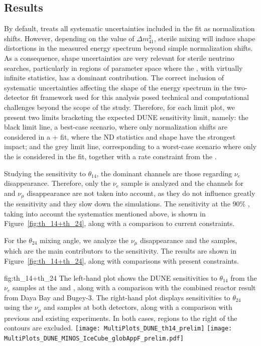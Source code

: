 \subsection{Results}
By default,  treats all systematic uncertainties included in the fit as normalization shifts. However, depending on the value of $\Delta m^2_{41}$, sterile mixing will induce shape distortions in the measured energy spectrum beyond simple normalization shifts. As a consequence, shape uncertainties are very relevant for sterile neutrino searches, particularly in regions of parameter space where the , with virtually infinite statistics, has a dominant contribution. The correct inclusion of systematic uncertainties affecting the shape of the energy spectrum in the two-detector fit  framework used for this analysis posed technical and computational challenges beyond the scope of the study.
Therefore, for each limit plot, we present two limits bracketing the expected DUNE sensitivity limit, namely: the black limit line, a best-case scenario, where only normalization shifts are considered in a + fit, where the ND statistics and shape have the strongest impact; and the grey limit line, corresponding to a worst-case scenario where only the  is considered in the fit, together with a rate constraint from the . 

Studying the sensitivity to $\theta_{14}$, the dominant channels are those regarding $\nu_e$ disappearance. Therefore, only the $\nu_e$  sample is analyzed and the channels for  and $\nu_{\mu}$  disappearance are not taken into account, as they do not influence greatly the sensitivity and they slow down the simulations. The sensitivity at the 90\% , taking into account the systematics mentioned above, is shown in Figure~\ref{fig:th_14+th_24}, along with a comparison to current constraints.

For the $\theta_{24}$ mixing angle, we analyze the $\nu_{\mu}$  disappearance and the  samples, which are the main contributors to the sensitivity. 
The results are shown in Figure~\ref{fig:th_14+th_24}, along with comparisons with present constraints.

\begin{dunefigure} %
{fig:th_14+th_24}
{The left-hand plot shows the DUNE sensitivities to $\theta_{14}$ from the $\nu_e$  samples at the  and , along with a comparison with the combined reactor result from Daya Bay and Bugey-3. The right-hand plot displays sensitivities to $\theta_{24}$ using the $\nu_\mu$  and  samples at both detectors, along with a comparison with previous and existing experiments. In both cases, regions to the right of the contours are excluded.}
\texttt{[image: MultiPlots\_DUNE\_th14\_prelim]}
\texttt{[image: MultiPlots\_DUNE\_MINOS\_IceCube\_globAppF\_prelim.pdf]}
\end{dunefigure}

